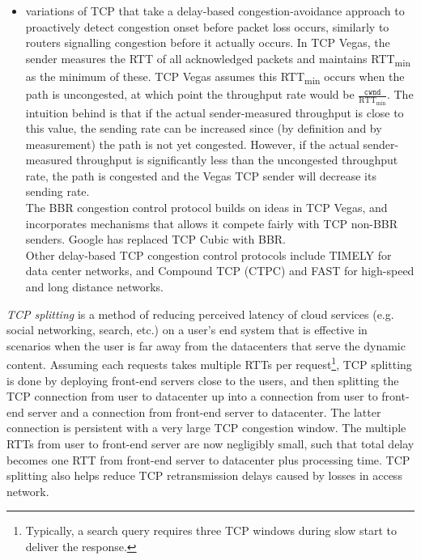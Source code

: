 \documentclass[8pt, table, xcdraw]{article}%
\begin{document}
\begin{itemize}
\begin{itemize}
        \item variations of TCP that take a delay-based congestion-avoidance approach to proactively detect congestion onset before packet loss occurs, similarly to routers signalling congestion before it actually occurs. In TCP Vegas, the sender measures the RTT of all acknowledged packets and maintains RTT\textsubscript{min} as the minimum of these. TCP Vegas assumes this RTT\textsubscript{min} occurs when the path is uncongested, at which point the throughput rate would be $\frac{\mathtt{cwnd}}{\text{RTT}_\text{min}}$. The intuition behind is that if the actual sender-measured throughput is close to this value, the sending rate can be increased since (by definition and by measurement) the path is not yet congested. However, if the actual sender-measured throughput is significantly less than the uncongested throughput rate, the path is congested and the Vegas TCP sender will decrease its sending rate.\\
        The BBR congestion control protocol builds on ideas in TCP Vegas, and incorporates mechanisms that allows it compete fairly with TCP non-BBR senders. Google has replaced TCP Cubic with BBR.\\
        Other delay-based TCP congestion control protocols include TIMELY for data center networks, and Compound TCP (CTPC) and FAST for high-speed and long distance networks.
    \end{itemize}
\end{itemize}



\emph{TCP splitting} is a method of reducing perceived latency of cloud services (e.g. social networking, search, etc.) on a user's end system that is effective in scenarios when the user is far away from the datacenters that serve the dynamic content. Assuming each requests takes multiple RTTs per request\footnote{Typically, a search query requires three TCP windows during slow start to deliver the response.}, TCP splitting is done by deploying front-end servers close to the users, and then splitting the TCP connection from user to datacenter up into a connection from user to front-end server and a connection from front-end server to datacenter. The latter connection is persistent with a very large TCP congestion window. The multiple RTTs from user to front-end server are now negligibly small, such that total delay becomes one RTT from front-end server to datacenter plus processing time. TCP splitting also helps reduce TCP retransmission delays caused by losses in access network.
\end{document}
